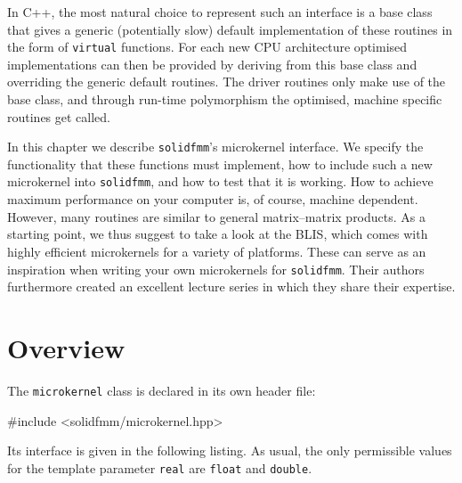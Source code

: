 \documentclass{scrbook}
\newcommand{\solidfmm}{\texttt{solidfmm}}
\begin{document}
In C++, the most natural choice to represent such an interface is a
base class that gives a generic (potentially slow) default
implementation of these routines in the form of
\lstinline[style=cpp]|virtual| functions. For each new CPU architecture
optimised implementations can then be provided by deriving from this base class
and overriding the generic default routines. The driver routines only make use
of the base class, and through run-time polymorphism the optimised, machine
specific routines get called.

In this chapter we describe \solidfmm's microkernel interface. We specify the
functionality that these functions must implement, how to include such
a new microkernel into \solidfmm, and how to test that it is working. How to
achieve maximum performance on your computer is, of course, machine dependent.
However, many routines are similar to general matrix--matrix products. As a
starting point, we thus suggest to take a look at the
BLIS\autocite{blisproject},
which comes with highly efficient microkernels for a variety of platforms.
These can serve as an inspiration when writing your own microkernels for
\solidfmm. Their authors furthermore created an excellent lecture series
in which they share their expertise.\autocite{blislecture}

\section{Overview}
The \lstinline|microkernel| class is declared in its own header file:
\begin{cppcode*}
#include <solidfmm/microkernel.hpp>
\end{cppcode*}

Its interface is given in the following listing. As usual, the only permissible
values for the template parameter \lstinline|real| are \lstinline[style=cpp]|float|
and \lstinline[style=cpp]|double|.
\end{document}
